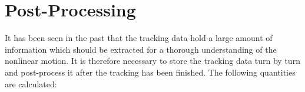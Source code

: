 
\section{Post-Processing} \label{PosPro}

It has been seen in the past that the tracking data hold a large amount of information which should be extracted for a thorough understanding of the nonlinear motion.
It is therefore necessary to store the tracking data turn by turn and post-process it after the tracking has been finished.
The following quantities are calculated:

